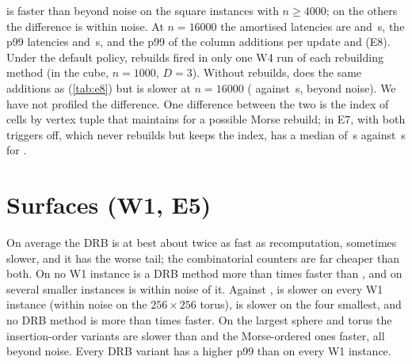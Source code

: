  is faster than  beyond noise on the square
instances with $n\ge4000$; on the others the difference is within noise. At
$n=16000$ the amortised latencies are
\NumWFourPlaneNSixteenThousandDTwoMmhmNorbAmort{} and
\NumWFourPlaneNSixteenThousandDTwoDrbIdAmort\,\textmu s, the p99 latencies
\NumWFourPlaneNSixteenThousandDTwoMmhmNorbPNinetyNine{} and
\NumWFourPlaneNSixteenThousandDTwoDrbIdPNinetyNine\,\textmu s, and the p99 of the
column additions per update
\NumEEightWFourPlaneNSixteenThousandDTwoMmhmNorbAddsPNinetyNine{} and
\NumEEightWFourPlaneNSixteenThousandDTwoDrbIdAddsPNinetyNine{} (E8). Under the
default policy, rebuilds fired in only one W4 run of each rebuilding method (in
the cube, $n=1000$, $D=3$). Without rebuilds,  does the same
additions as  (\cref{tab:e8}) but is slower at $n=16000$
(\NumWFourPlaneNSixteenThousandDTwoMmhmAmort{} against
\NumWFourPlaneNSixteenThousandDTwoMmhmNorbAmort\,\textmu s, beyond noise). We have
not profiled the difference. One difference between the two is the index of
cells by vertex tuple that  maintains for a possible Morse
rebuild; in E7,  with both triggers off, which never rebuilds but
keeps the index, has a median of
\NumESevenWFourPlaneNSixteenThousandDTwoMmhmAOffPOffMed\,\textmu s against
\NumWFourPlaneNSixteenThousandDTwoMmhmNorbMed\,\textmu s for .


\section{Surfaces (W1, E5)}\label{sec:s-surfaces}\label{sec:e5}


On average the DRB is at best about twice as fast as recomputation, sometimes
slower, and it has the worse tail; the combinatorial counters are far cheaper
than both. On no W1 instance is a DRB method more than
\NumWOneSphereLFiveMmhmSpeedupFullId{} times faster than , and on
several smaller instances  is within noise of it. Against
,  is slower on every W1 instance (within noise
on the $256\times256$ torus),  is slower on the four smallest,
and no DRB method is more than \NumWOneSphereLSevenMmhmNorbSpeedupFullSorted{}
times faster. On the
largest sphere and torus the insertion-order variants are slower than
 and the Morse-ordered ones faster, all beyond noise. Every DRB
variant has a higher p99 than  on every W1 instance.

